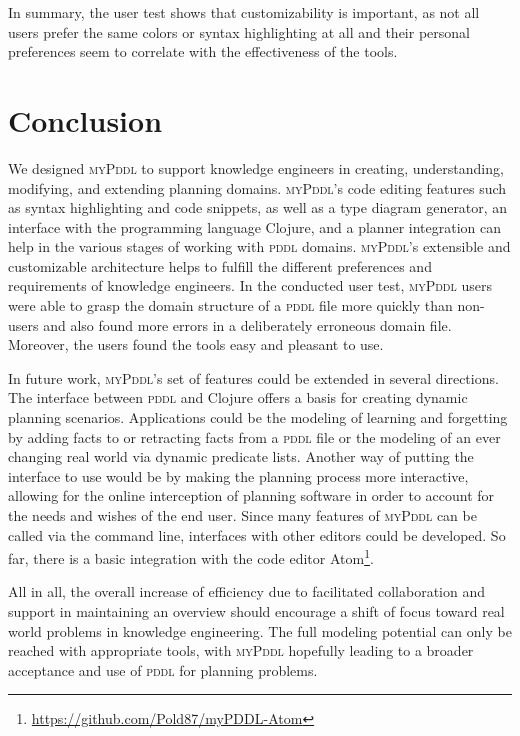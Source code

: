 \documentclass[runningheads]{llncs}
\newcommand{\mypddl}{\textsc{myPddl}\xspace}
\newcommand{\pddl}{\textsc{pddl}\xspace}
\begin{document}
In summary, the user test shows that customizability is important, as
not all users prefer the same colors or syntax highlighting at all and
their personal preferences seem to correlate with the effectiveness of
the tools.

\section{Conclusion}
\label{sec:conclusion}

We designed \mypddl to support knowledge engineers in creating,
understanding, modifying, and extending planning domains. \mypddl's
code editing features such as syntax highlighting and code snippets,
as well as a type diagram generator, an interface with the programming
language Clojure, and a planner integration can help in the various
stages of working with \pddl domains. \mypddl's extensible and
customizable architecture helps to fulfill the different preferences
and requirements of knowledge engineers. In the conducted user test,
\mypddl users were able to grasp the domain structure of a \pddl file
more quickly than non-users and also found more errors in a
deliberately erroneous domain file. Moreover, the users found the
tools easy and pleasant to use.

In future work, \mypddl's set of features could be extended in several
directions. The interface between \pddl and Clojure offers a basis for
creating dynamic planning scenarios. Applications could be the
modeling of learning and forgetting by adding facts to or retracting
facts from a \pddl file or the modeling of an ever changing real world
via dynamic predicate lists. Another way of putting the interface to
use would be by making the planning process more interactive, allowing
for the online interception of planning software in order to account
for the needs and wishes of the end user. Since many features of
\mypddl can be called via the command line, interfaces with other
editors could be developed. So far, there is a basic integration with
the code editor
Atom\footnote{\url{https://github.com/Pold87/myPDDL-Atom}}.

All in all, the overall increase of efficiency due to facilitated
collaboration and support in maintaining an overview should encourage
a shift of focus toward real world problems in knowledge
engineering. The full modeling potential can only be reached with
appropriate tools, with \mypddl hopefully leading to a broader
acceptance and use of \pddl for planning problems.
\end{document}

